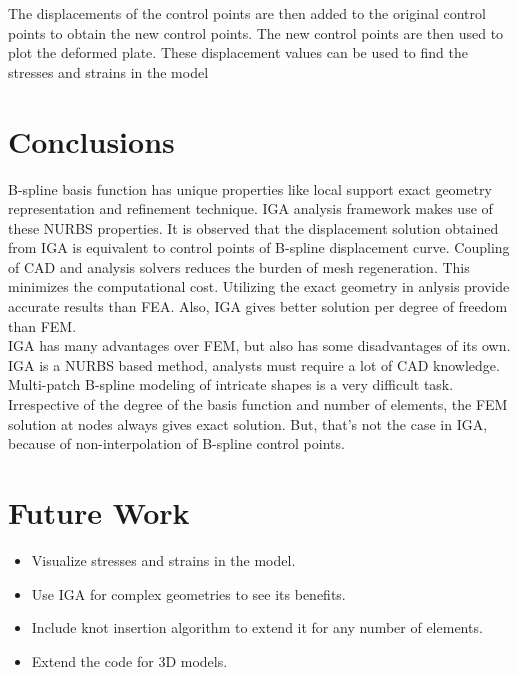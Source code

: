 \documentclass[submit,12pt]{aiaa-pretty} %
\begin{document}
The displacements of the control points are then added to the original control points to obtain the new control points. The new control points are then used to plot the deformed plate. These displacement values can be used to find the stresses and strains in the model

\section{Conclusions}
B-spline basis function has unique properties like local support exact geometry representation and refinement technique. IGA analysis framework makes use of these NURBS properties. It is observed that the displacement solution obtained from IGA is equivalent to control points of B-spline displacement curve. Coupling of CAD and analysis solvers reduces the burden of mesh regeneration. This minimizes the computational cost. Utilizing the exact geometry in anlysis provide accurate results than FEA. Also, IGA gives better solution per degree of freedom than FEM. \\
IGA has many advantages over FEM, but also has some disadvantages of its own. IGA is a NURBS based method, analysts must require a lot of CAD knowledge. Multi-patch B-spline modeling of intricate shapes is a very difficult task. Irrespective of the degree of the basis function and number of elements, the FEM solution at nodes always gives exact solution. But, that's not the case in IGA, because of non-interpolation of B-spline control points.  

\section{Future Work}
\begin{itemize}
    \item Visualize stresses and strains in the model.
    \item Use IGA for complex geometries to see its benefits.
    \item Include knot insertion algorithm to extend it for any number of elements.
    \item Extend the code for 3D models.
\end{itemize}
\newpage




 
\end{document}
